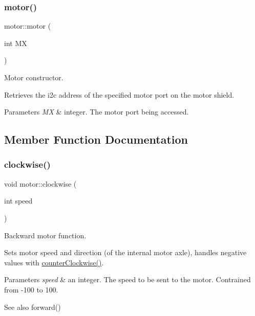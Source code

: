 \subsubsection{\texorpdfstring{motor()}{motor()}}
{\footnotesize\ttfamily motor\+::motor (\begin{DoxyParamCaption}\item[{int}]{MX }\end{DoxyParamCaption})}



Motor constructor. 

Retrieves the i2c address of the specified motor port on the motor shield. 
\begin{DoxyParams}{Parameters}
{\em MX} & integer. The motor port being accessed. \\
\hline
\end{DoxyParams}


\subsection{Member Function Documentation}
\mbox{\label{classmotor_aa430473ab7a4844313c74f25e8ad680b}} 
\subsubsection{\texorpdfstring{clockwise()}{clockwise()}}
{\footnotesize\ttfamily void motor\+::clockwise (\begin{DoxyParamCaption}\item[{int}]{speed }\end{DoxyParamCaption})}



Backward motor function. 

Sets motor speed and direction (of the internal motor axle), handles negative values with \mbox{\hyperlink{classmotor_a25458366e1d0097574640c68fbc618b3}{counter\+Clockwise()}}. 
\begin{DoxyParams}{Parameters}
{\em speed} & an integer. The speed to be sent to the motor. Contrained from -\/100 to 100. \\
\hline
\end{DoxyParams}
\begin{DoxySeeAlso}{See also}
forward() 
\end{DoxySeeAlso}
\mbox{\label{classmotor_a25458366e1d0097574640c68fbc618b3}} 
